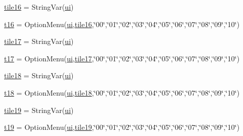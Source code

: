 \begin{DoxyCompactItemize}
\item 
\mbox{\hyperlink{namespacegui_acbacb920e84bd9606a9c5d5f9e948d8c}{tile16}} = String\+Var(\mbox{\hyperlink{namespacegui_a40ab7281456eadbea2dc2038f5c24fa1}{ui}})
\item 
\mbox{\hyperlink{namespacegui_a51b462c2a4622a8017621387cf619f5d}{t16}} = Option\+Menu(\mbox{\hyperlink{namespacegui_a40ab7281456eadbea2dc2038f5c24fa1}{ui}},\mbox{\hyperlink{namespacegui_acbacb920e84bd9606a9c5d5f9e948d8c}{tile16}},\char`\"{}00\char`\"{},\char`\"{}01\char`\"{},\char`\"{}02\char`\"{},\char`\"{}03\char`\"{},\char`\"{}04\char`\"{},\char`\"{}05\char`\"{},\char`\"{}06\char`\"{},\char`\"{}07\char`\"{},\char`\"{}08\char`\"{},\char`\"{}09\char`\"{},\char`\"{}10\char`\"{})
\item 
\mbox{\hyperlink{namespacegui_aa98b8a15d8433c66120f88e562f8c2e8}{tile17}} = String\+Var(\mbox{\hyperlink{namespacegui_a40ab7281456eadbea2dc2038f5c24fa1}{ui}})
\item 
\mbox{\hyperlink{namespacegui_a7e746bea37f63fd2a311fdc4083b5442}{t17}} = Option\+Menu(\mbox{\hyperlink{namespacegui_a40ab7281456eadbea2dc2038f5c24fa1}{ui}},\mbox{\hyperlink{namespacegui_aa98b8a15d8433c66120f88e562f8c2e8}{tile17}},\char`\"{}00\char`\"{},\char`\"{}01\char`\"{},\char`\"{}02\char`\"{},\char`\"{}03\char`\"{},\char`\"{}04\char`\"{},\char`\"{}05\char`\"{},\char`\"{}06\char`\"{},\char`\"{}07\char`\"{},\char`\"{}08\char`\"{},\char`\"{}09\char`\"{},\char`\"{}10\char`\"{})
\item 
\mbox{\hyperlink{namespacegui_aabbaa4aef16bc80ffc978a99aa5d49bc}{tile18}} = String\+Var(\mbox{\hyperlink{namespacegui_a40ab7281456eadbea2dc2038f5c24fa1}{ui}})
\item 
\mbox{\hyperlink{namespacegui_a231c57c39180acbf6e0a96db8a761894}{t18}} = Option\+Menu(\mbox{\hyperlink{namespacegui_a40ab7281456eadbea2dc2038f5c24fa1}{ui}},\mbox{\hyperlink{namespacegui_aabbaa4aef16bc80ffc978a99aa5d49bc}{tile18}},\char`\"{}00\char`\"{},\char`\"{}01\char`\"{},\char`\"{}02\char`\"{},\char`\"{}03\char`\"{},\char`\"{}04\char`\"{},\char`\"{}05\char`\"{},\char`\"{}06\char`\"{},\char`\"{}07\char`\"{},\char`\"{}08\char`\"{},\char`\"{}09\char`\"{},\char`\"{}10\char`\"{})
\item 
\mbox{\hyperlink{namespacegui_a73e86c0a1db0de3424a7ca918dd92542}{tile19}} = String\+Var(\mbox{\hyperlink{namespacegui_a40ab7281456eadbea2dc2038f5c24fa1}{ui}})
\item 
\mbox{\hyperlink{namespacegui_a117c24cfee6369ee7d416f222b37a797}{t19}} = Option\+Menu(\mbox{\hyperlink{namespacegui_a40ab7281456eadbea2dc2038f5c24fa1}{ui}},\mbox{\hyperlink{namespacegui_a73e86c0a1db0de3424a7ca918dd92542}{tile19}},\char`\"{}00\char`\"{},\char`\"{}01\char`\"{},\char`\"{}02\char`\"{},\char`\"{}03\char`\"{},\char`\"{}04\char`\"{},\char`\"{}05\char`\"{},\char`\"{}06\char`\"{},\char`\"{}07\char`\"{},\char`\"{}08\char`\"{},\char`\"{}09\char`\"{},\char`\"{}10\char`\"{})

\end{DoxyCompactItemize}

